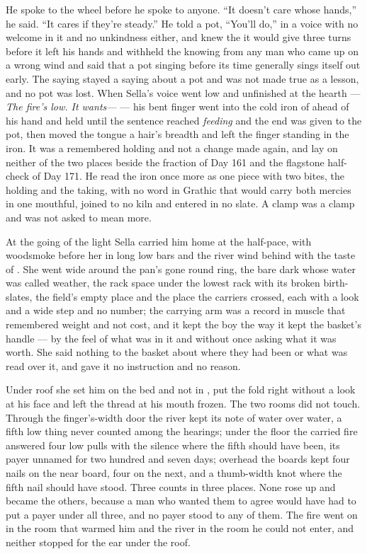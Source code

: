 He spoke to the wheel before he spoke to anyone. “It doesn't care whose hands,” he said. “It cares if they're steady.” He told a pot, “You'll do,” in a voice with no welcome in it and no unkindness either, and knew the  it would give three turns before it left his hands and withheld the knowing from any man who came up on a wrong wind and said that a pot singing before its time generally sings itself out early. The saying stayed a saying about a pot and was not made true as a lesson, and no pot was lost. When Sella's voice went low and unfinished at the hearth --- \emph{The fire's low. It wants---} --- his bent finger went into the cold iron of  ahead of his hand and held until the sentence reached \emph{feeding} and the end was given to the pot, then moved the tongue a hair's breadth and left the finger standing in the iron. It was a remembered holding and not a change made again, and lay on neither of the two places beside the fraction of Day 161 and the flagstone half-check of Day 171. He read the iron once more as one piece with two bites, the holding and the taking, with no word in Grathic that would carry both mercies in one mouthful, joined to no kiln and entered in no slate. A clamp was a clamp and was not asked to mean more.

\scenebreak

At the going of the light Sella carried him home at the half-pace, with woodsmoke before her in long low bars and the river wind behind with the taste of . She went wide around the pan's gone round ring, the bare dark  whose water was called weather, the rack space under the lowest rack with its broken birth-slates, the field's empty place and the place the carriers crossed, each with a look and a wide step and no number; the carrying arm was a record in muscle that remembered weight and not cost, and it kept the boy the way it kept the basket's handle --- by the feel of what was in it and without once asking what it was worth. She said nothing to the basket about where they had been or what was read over it, and gave it no instruction and no reason.

Under  roof she set him on the bed and not in , put the fold right without a look at his face and left the thread at his mouth frozen. The two rooms did not touch. Through the finger's-width door the river kept its note of water over water, a fifth low thing never counted among the hearings; under the floor the carried fire answered four low pulls with the silence where the fifth should have been, its payer unnamed for two hundred and seven days; overhead the boards kept four nails on the near board, four on the next, and a thumb-width knot where the fifth nail should have stood. Three counts in three places. None rose up and became the others, because a man who wanted them to agree would have had to put a payer under all three, and no payer stood to any of them. The fire went on in the room that warmed him and the river in the room he could not enter, and neither stopped for the ear under the roof.


